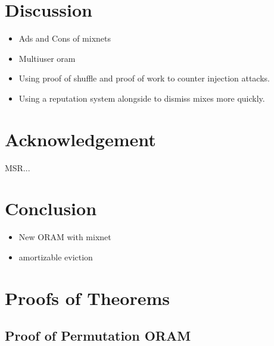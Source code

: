 \documentclass[conference]{IEEEtran}
\begin{document}
\section{Discussion}
\begin{itemize}
 \item Ads and Cons of mixnets
 \item Multiuser oram
 \item Using proof of shuffle and proof of work to counter injection attacks.
 \item Using a reputation system alongside to dismiss mixes more quickly.
\end{itemize}

\section{Acknowledgement}
MSR...

\section{Conclusion}
\begin{itemize}
 \item New ORAM with mixnet
 \item amortizable eviction
\end{itemize}



{}

\clearpage
\appendix 
\section{Proofs of Theorems}

\subsection{Proof of Permutation ORAM}
\end{document}
